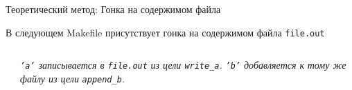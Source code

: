     \begin{frame}[label=current]{Теоретический метод: Гонка на содержимом файла}

        В следующем Makefile присутствует гонка на содержимом файла \texttt{file.out}

        \begin{columns}[t]
            \begin{column}{.3 \textwidth}
                \newline
            \end{column}
            \begin{column}{.4 \textwidth}
                \newline \newline \newline
                \textit{\texttt{'a'} записывается в \texttt{file.out}}
                \newline
                \textit{из цели \texttt{write\_a}.}
                \newline
                \newline
                \textit{\texttt{'b'} добавляется к}
                \newline
                \textit{тому же файлу из цели}
                \newline
                \textit{\texttt{append\_b}.}
            \end{column}
        \end{columns}

        \vspace{1.2em}


\end{frame}
